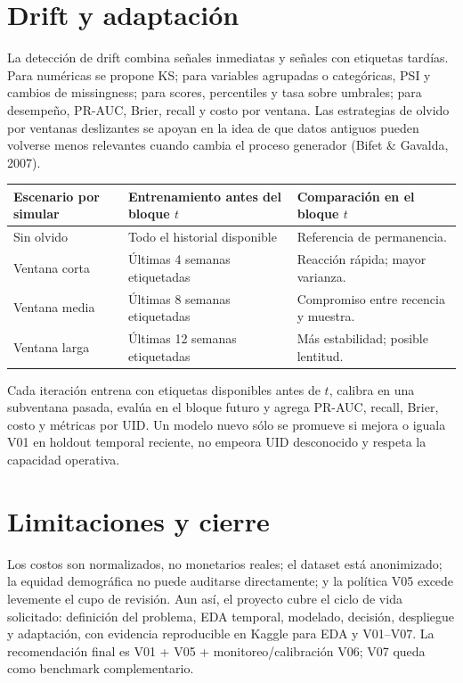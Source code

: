 \documentclass[11pt,letterpaper]{article}
\begin{document}
\section{Drift y adaptación}

La detección de drift combina señales inmediatas y señales con etiquetas tardías. Para numéricas se propone KS; para variables agrupadas o categóricas, PSI y cambios de missingness; para scores, percentiles y tasa sobre umbrales; para desempeño, PR-AUC, Brier, recall y costo por ventana. Las estrategias de olvido por ventanas deslizantes se apoyan en la idea de que datos antiguos pueden volverse menos relevantes cuando cambia el proceso generador (Bifet \& Gavalda, 2007).

\begin{table}[H]\centering\small
\begin{tabularx}{\linewidth}{@{}p{.22\linewidth}X X@{}}\toprule
Escenario por simular & Entrenamiento antes del bloque $t$ & Comparación en el bloque $t$\\\midrule
Sin olvido & Todo el historial disponible & Referencia de permanencia.\\
Ventana corta & Últimas 4 semanas etiquetadas & Reacción rápida; mayor varianza.\\
Ventana media & Últimas 8 semanas etiquetadas & Compromiso entre recencia y muestra.\\
Ventana larga & Últimas 12 semanas etiquetadas & Más estabilidad; posible lentitud.\\\bottomrule
\end{tabularx}
\end{table}

Cada iteración entrena con etiquetas disponibles antes de $t$, calibra en una subventana pasada, evalúa en el bloque futuro y agrega PR-AUC, recall, Brier, costo y métricas por UID. Un modelo nuevo sólo se promueve si mejora o iguala V01 en holdout temporal reciente, no empeora UID desconocido y respeta la capacidad operativa.

\section{Limitaciones y cierre}

Los costos son normalizados, no monetarios reales; el dataset está anonimizado; la equidad demográfica no puede auditarse directamente; y la política V05 excede levemente el cupo de revisión. Aun así, el proyecto cubre el ciclo de vida solicitado: definición del problema, EDA temporal, modelado, decisión, despliegue y adaptación, con evidencia reproducible en Kaggle para EDA y V01--V07. La recomendación final es V01 + V05 + monitoreo/calibración V06; V07 queda como benchmark complementario.
\end{document}
